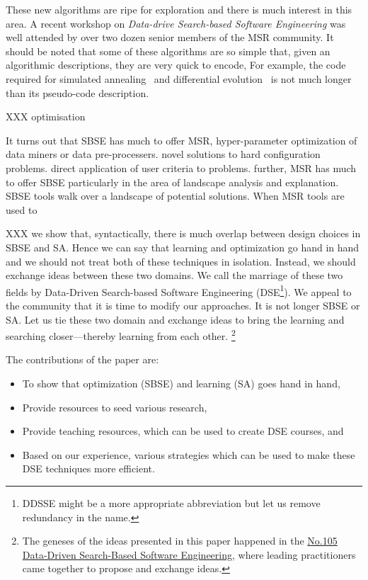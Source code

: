 \documentclass[table, xcdraw, sigconf,review, anonymous]{acmart}
\begin{document}
These new algorithms are ripe for exploration and there is much interest in this area.
A recent workshop  on {\em Data-drive Search-based Software
Engineering } was well attended by over two dozen senior members of the MSR community.
It should be noted that some of these algorithms are so simple that, 
given an algorithmic descriptions, they are very quick to encode,
For example, the code required for simulated annealing~\cite{van1987simulated} and
differential evolution~\cite{storn97} is not much longer than its pseudo-code description. 

XXX optimisation

It turns out that SBSE has much to offer MSR, hyper-parameter optimization of data miners or data pre-processers. novel solutions to hard configuration problems. direct application of user criteria to problems. further, MSR has much to offer SBSE particularly in the area of landscape analysis and explanation. SBSE tools walk over a landscape of potential solutions. When MSR tools are used to 

XXX we show that,  syntactically, there is much overlap between design choices in SBSE and SA. Hence we can say that learning and optimization go hand in hand and we should not treat both of these techniques in isolation. Instead, we should exchange ideas between these two domains. We call the marriage of these two fields by Data-Driven Search-based Software Engineering (DSE\footnote{DDSSE might be a more appropriate abbreviation but let us remove redundancy in the name.}). We appeal to the community that it is time to modify our approaches. It is not longer SBSE or SA. Let us tie these two domain and exchange ideas to bring the learning and searching closer---thereby learning from each other. \footnote{The geneses of the ideas presented in this paper happened in the \href{http://shonan.nii.ac.jp/shonan/blog/2016/09/08/data-driven-search-based-software-engineering/}{No.105 Data-Driven Search-Based Software Engineering}, where leading practitioners came together to propose and exchange ideas.}  

The contributions of the paper are:
\begin{itemize}
    \item To show that optimization (SBSE) and learning (SA) goes hand in hand,
    \item Provide resources to seed various research,
    \item Provide teaching resources, which can be used to create DSE courses, and
    \item Based on our experience, various strategies which can be used to make these DSE techniques more efficient.
\end{itemize}
\end{document}
